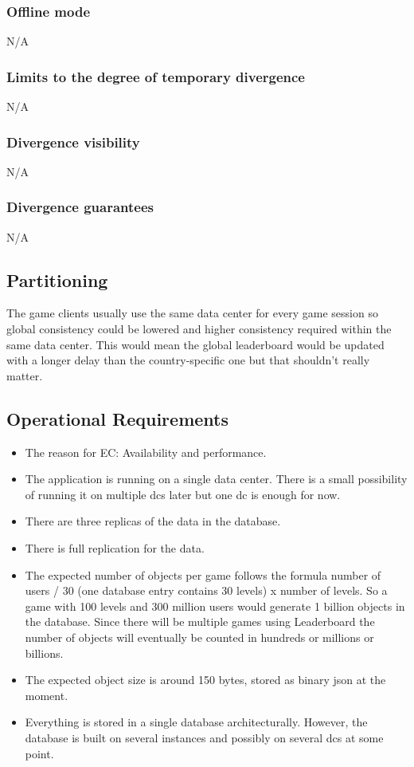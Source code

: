 \documentclass[11pt,a4paper]{report}
\begin{document}
\subsubsection{Offline mode}
N/A

\subsubsection{Limits to the degree of temporary divergence}
N/A

\subsubsection{Divergence visibility}
N/A

\subsubsection{Divergence guarantees}
N/A

\subsection{Partitioning}
The game clients usually use the same data center for every game session so global consistency could be lowered and higher consistency required within the same data center. This would mean the global leaderboard would be updated with a longer delay than the country-specific one but that shouldn't really matter.


\subsection{Operational Requirements}
\begin{itemize}
\item The reason for EC: Availability and performance.
\item The application is running on a single data center. There is a small possibility of running it on multiple \glspl{dc} later but one \gls{dc} is enough for now.
\item There are three replicas of the data in the database.
\item There is full replication for the data.
\item The expected number of objects per game follows the formula number of users / 30 (one database entry contains 30 levels) x number of levels. So a game with 100 levels and 300 million users would generate 1 billion objects in the database. Since there will be multiple games using Leaderboard the number of objects will eventually be counted in hundreds or millions or billions.
\item The expected object size is around 150 bytes, stored as binary json at the moment.
\item Everything is stored in a single database architecturally. However, the database is built on several instances and possibly on several \glspl{dc} at some point.
\end{itemize}
\end{document}
